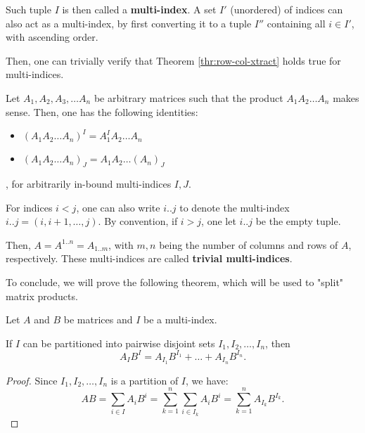 Such tuple \( I \) is then called a \textbf{multi-index}. A set \( I' \)
(unordered) of indices can also act as a multi-index, by first converting it to
a tuple \( I'' \) containing all \( i \in I' \), with ascending order.

Then, one can trivially verify that Theorem \ref{thr:row-col-xtract} holds true
for multi-indices.

\begin{theorem}
  Let \( A_{1}, A_{2}, A_{3}, \ldots A_{n} \) be arbitrary matrices such that
  the product \( A_{1}A_{2}\ldots A_{n}  \) makes sense. Then, one has the
  following identities:

  \begin{itemize}
    \item \( (A_{1}A_{2}\ldots A_{n})^{I} = A_{1}^{I}A_{2}\ldots A_{n} \)
    \item \( (A_{1}A_{2}\ldots A_{n})_{J} = A_{1}A_{2}\ldots (A_{n})_{J} \)
  \end{itemize}, for arbitrarily in-bound multi-indices \( I, J \).
\end{theorem}

For indices \( i < j \), one can also write \( i .. j \) to denote the
multi-index \( i .. j = (i, i + 1, \ldots , j) \). By convention, if \( i > j
\), one let \( i .. j \) be the empty tuple.

Then, \( A = A^{1..n} = A_{1..m} \), with \( m,n  \) being the number of columns
and rows of \( A \), respectively. These multi-indices are called
\textbf{trivial multi-indices}.

To conclude, we will prove the following theorem, which will be used to "split"
matrix products.

\begin{theorem}
  Let \( A \) and \( B \) be matrices and \( I \) be a multi-index.

  If \( I \) can be partitioned into pairwise disjoint sets \( I_{1}, I_{2}, \ldots,
  I_{n} \), then
  \[
    A_{I}B^{I} = A_{I_{1}}B^{I_{1}} + \ldots +A_{I_{n}}B^{I_{n}}
  .\] 
\end{theorem}

\begin{proof}
  Since \( I_{1}, I_{2}, \ldots , I_{n} \) is a partition of \( I \), we have:
  \[
    AB = \sum_{i \in I} A_{i}B^{i} = \sum_{k = 1}^{n} \sum_{i \in I_{k}}
    A_{i}B^{i} = \sum_{k=1}^{n} A_{I_{k}}B^{I_{k}}
  .\] 
\end{proof}


